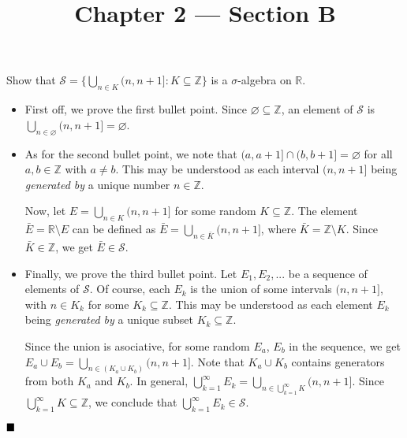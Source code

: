 \documentclass[11pt, a4paper, tikz]{article}
\newcommand{\centsection}[1]{
	\section*{\centering{#1}}
}
\renewcommand{\qed}{\hfill\blacksquare}
\newcommand{\Bigcup}[2]{\displaystyle \bigcup_{#1}^{#2}}
\newcommand{\integers}{
	\ensuremath{\mathbb{Z}}
}
\newcommand{\reals}{
	\ensuremath{\mathbb{R}}
}
\newcommand{\sigmaAlgebra}[1]{
	\ensuremath{\mathcal{#1}}
}
\begin{document}
	\title{\textbf{Chapter 2 — Section B}}
	\maketitle
	\centsection{Exercise 1}
	
	\begin{formulationBox}
		Show that $\sigmaAlgebra{S} = \{\bigcup_{n\in K}(n, n+1]:K\subseteq\integers\}$ is a $\sigma$-algebra on $\reals$.
	\end{formulationBox}

	\begin{itemize}
	\item First off, we prove the first bullet point. Since $\varnothing\subseteq\integers$, an element of $\sigmaAlgebra{S}$ is $\bigcup_{n\in\varnothing}(n, n+1] = \varnothing$.
	
	\item As for the second bullet point, we note that $(a, a+1]\cap(b, b+1] = \varnothing$ for all $a,b\in\integers$ with $a\neq b$. This may be understood as each interval $(n, n+1]$ being \textit{generated by} a unique number $n\in\integers$.
	
	Now, let $E = \bigcup_{n\in K}(n, n+1]$ for some random $K\subseteq\integers$. The element $\bar{E} = \reals\setminus E$ can be defined as $\bar{E} = \bigcup_{n\in \bar{K}}(n, n+1]$, where $\bar{K} = \integers\setminus K$. Since $\bar{K}\in\integers$, we get $\bar{E}\in\sigmaAlgebra{S}$.
	
	\item Finally, we prove the third bullet point. Let $E_1, E_2, ...$ be a sequence of elements of $\sigmaAlgebra{S}$. Of course, each $E_k$ is the union of some intervals $(n, n+1]$, with $n\in K_k$ for some $K_k\subseteq\integers$. This may be understood as each element $E_k$ being \textit{generated by} a unique subset $K_k\subseteq\integers$.
	
	Since the union is asociative, for some random $E_a$, $E_b$ in the sequence, we get $E_a\cup E_b = \bigcup_{n\in(K_a\cup K_b)}(n, n+1]$. Note that $K_a\cup K_b$ contains generators from both $K_a$ and $K_b$. In general, $\Bigcup{k=1}{\infty}E_k = \bigcup_{n\in\bigcup_{k=1}^{\infty}K}(n, n+1]$. Since $\bigcup_{k=1}^{\infty}K \subseteq \integers$, we conclude that $\bigcup_{k=1}^{\infty}E_k \in \sigmaAlgebra{S}$.
	
	\end{itemize}
	
	$\qed$
	
	\centsection{Exercise 2}
	
\end{document}
